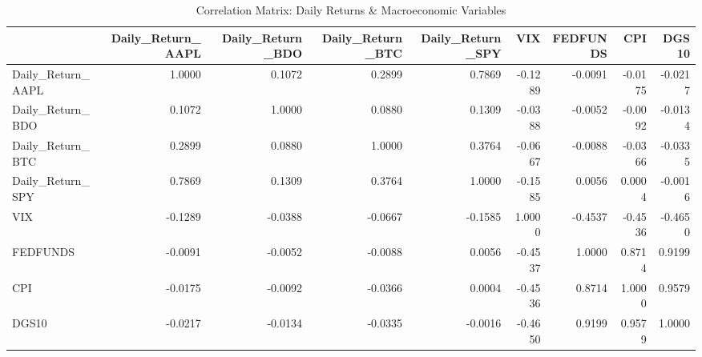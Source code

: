 \begin{table}[H]
\centering
\caption{Correlation Matrix: Daily Returns \& Macroeconomic Variables}
\label{tab:correlation_matrix}
\begin{safetable}
\begin{tabular}{lrrrrrrrr}
\toprule
 &  Daily\_Return\_AAPL & Daily\_Return\_BDO & Daily\_Return\_BTC & Daily\_Return\_SPY & VIX & FEDFUNDS & CPI & DGS10 \\
\midrule
Daily\_Return\_AAPL & 1.0000 & 0.1072 & 0.2899 & 0.7869 & -0.1289 & -0.0091 & -0.0175 & -0.0217\\
Daily\_Return\_BDO & 0.1072 & 1.0000 & 0.0880 & 0.1309 & -0.0388 & -0.0052 & -0.0092 & -0.0134\\
Daily\_Return\_BTC & 0.2899 & 0.0880 & 1.0000 & 0.3764 & -0.0667 & -0.0088 & -0.0366 & -0.0335\\
Daily\_Return\_SPY & 0.7869 & 0.1309 & 0.3764 & 1.0000 & -0.1585 & 0.0056 & 0.0004 & -0.0016\\
VIX & -0.1289 & -0.0388 & -0.0667 & -0.1585 & 1.0000 & -0.4537 & -0.4536 & -0.4650\\
FEDFUNDS & -0.0091 & -0.0052 & -0.0088 & 0.0056 & -0.4537 & 1.0000 & 0.8714 & 0.9199\\
CPI & -0.0175 & -0.0092 & -0.0366 & 0.0004 & -0.4536 & 0.8714 & 1.0000 & 0.9579\\
DGS10 & -0.0217 & -0.0134 & -0.0335 & -0.0016 & -0.4650 & 0.9199 & 0.9579 & 1.0000\\
\bottomrule
\end{tabular}
\end{safetable}
\end{table}
